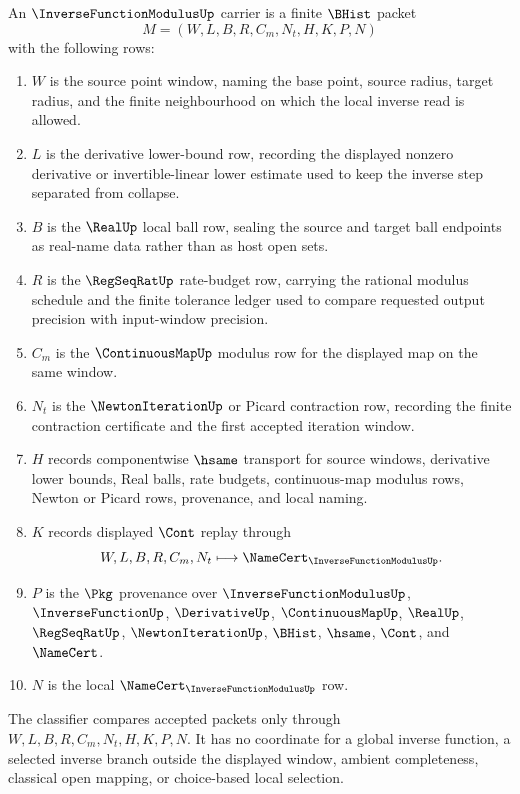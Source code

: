 \begin{definition}
\label{def:inverse-function-modulus-carrier}
An $\InverseFunctionModulusUp$ carrier is a finite $\BHist$ packet
$$
M=(W,L,B,R,C_m,N_t,H,K,P,N)
$$
with the following rows:
\begin{enumerate}
\item $W$ is the source point window, naming the base point, source radius, target radius, and the finite neighbourhood on which the local inverse read is allowed.
\item $L$ is the derivative lower-bound row, recording the displayed nonzero derivative or invertible-linear lower estimate used to keep the inverse step separated from collapse.
\item $B$ is the $\RealUp$ local ball row, sealing the source and target ball endpoints as real-name data rather than as host open sets.
\item $R$ is the $\RegSeqRatUp$ rate-budget row, carrying the rational modulus schedule and the finite tolerance ledger used to compare requested output precision with input-window precision.
\item $C_m$ is the $\ContinuousMapUp$ modulus row for the displayed map on the same window.
\item $N_t$ is the $\NewtonIterationUp$ or Picard contraction row, recording the finite contraction certificate and the first accepted iteration window.
\item $H$ records componentwise $\hsame$ transport for source windows, derivative lower bounds, Real balls, rate budgets, continuous-map modulus rows, Newton or Picard rows, provenance, and local naming.
\item $K$ records displayed $\Cont$ replay through
$$
W,L,B,R,C_m,N_t \longmapsto \NameCert_{\InverseFunctionModulusUp}.
$$
\item $P$ is the $\Pkg$ provenance over $\InverseFunctionModulusUp$, $\InverseFunctionUp$, $\DerivativeUp$, $\ContinuousMapUp$, $\RealUp$, $\RegSeqRatUp$, $\NewtonIterationUp$, $\BHist$, $\hsame$, $\Cont$, and $\NameCert$.
\item $N$ is the local $\NameCert_{\InverseFunctionModulusUp}$ row.
\end{enumerate}
The classifier compares accepted packets only through $W,L,B,R,C_m,N_t,H,K,P,N$. It has no coordinate for a global inverse function, a selected inverse branch outside the displayed window, ambient completeness, classical open mapping, or choice-based local selection.
\end{definition}

